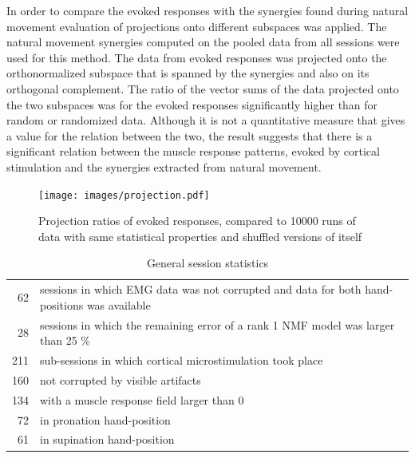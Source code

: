 In order to compare the evoked responses with the synergies found during natural movement evaluation of projections 
onto different subspaces was applied. The natural movement synergies computed on the pooled data from all sessions
were used for this method. The data from evoked responses was projected onto the orthonormalized subspace that is spanned
by the synergies and also on its orthogonal complement. The ratio of the vector sums of the data projected onto the two subspaces
was for the evoked responses significantly higher than for random or randomized data. Although it is not a quantitative measure
that gives a value for the relation between the two, the result suggests that there is a significant relation between the muscle 
response patterns, evoked by cortical stimulation and the synergies extracted from natural movement. 
\begin{figure}[ht]
	\centering
		\texttt{[image: images/projection.pdf]}
	\caption{Projection ratios of evoked responses, compared to 10000 runs of data with same statistical properties and shuffled 
	versions of itself}
	\label{sg:fig:images_projection}
\end{figure}






\bigskip

\begin{table}[hb]
 \centering
 \begin{tabular}{ r p{10cm}}
  \toprule
  	62  	& 	sessions in which EMG data was not corrupted and data for both hand-positions was available\\
  	28 		& 	sessions in which the remaining error of a rank 1 NMF model was larger than 25 \%\\
	\toprule
	211 	& sub-sessions in which cortical microstimulation took place \\
	160  	& not corrupted by visible artifacts\\
	134		& with a muscle response field larger than 0\\
	\midrule
	72 		& in pronation hand-position\\
	61 		& in supination hand-position\\
	\bottomrule
 \end{tabular}
 \caption{General session statistics}
 \label{tab:non_evo_sess_stat}
\end{table}




